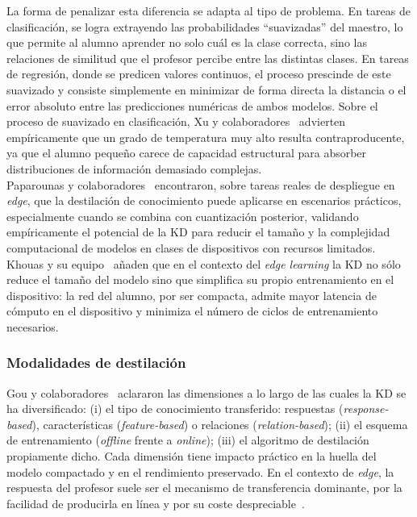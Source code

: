 \documentclass[a4paper,12pt,twoside,final]{book}
\begin{document}
La forma de penalizar esta diferencia se adapta al tipo de problema. En tareas de clasificación, se logra extrayendo
las probabilidades ``suavizadas'' del maestro, lo que permite al alumno aprender no solo cuál es la clase correcta,
sino las relaciones de similitud que el profesor percibe entre las distintas clases. En tareas de regresión, donde se
predicen valores continuos, el proceso prescinde de este suavizado y consiste simplemente en minimizar de forma
directa la distancia o el error absoluto entre las predicciones numéricas de ambos modelos. Sobre el proceso de
suavizado en clasificación, Xu y colaboradores~\cite{xu2023ieecomst} advierten empíricamente que un grado de
temperatura muy alto resulta contraproducente, ya que el alumno pequeño carece de capacidad estructural para absorber
distribuciones de información demasiado complejas.\\

Paparounas y colaboradores~\cite{paparounas2025pci} encontraron, sobre tareas reales de despliegue en \textit{edge},
que la destilación de conocimiento puede aplicarse en escenarios prácticos, especialmente cuando se combina con
cuantización posterior, validando empíricamente el potencial de la KD para reducir el tamaño y la complejidad
computacional de modelos en clases de dispositivos con recursos limitados. Khouas y su
equipo~\cite{khouas2024edgesurvey} añaden que en el contexto del \textit{edge learning} la KD no sólo reduce el
tamaño del modelo sino que simplifica su propio entrenamiento en el dispositivo: la red del alumno, por ser compacta,
admite mayor latencia de cómputo en el dispositivo y minimiza el número de ciclos de entrenamiento necesarios.

\subsubsection{Modalidades de destilación}
Gou y colaboradores~\cite{gou2021ijcv} aclararon las dimensiones a lo largo de las cuales la KD se ha diversificado:
(i) el tipo de conocimiento transferido: respuestas (\textit{response-based}), características (\textit{feature-based})
o relaciones (\textit{relation-based}); (ii) el esquema de entrenamiento (\textit{offline} frente a \textit{online});
(iii) el algoritmo de destilación propiamente dicho. Cada dimensión tiene impacto práctico en la huella del modelo
compactado y en el rendimiento preservado. En el contexto de \textit{edge}, la respuesta del profesor suele ser el
mecanismo de transferencia dominante, por la facilidad de producirla en línea y por su coste
despreciable~\cite{gou2021ijcv}.\\
\end{document}
